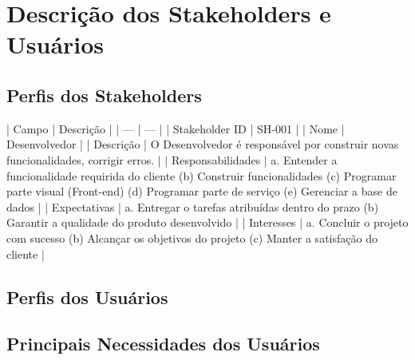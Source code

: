 \chapter{Descrição dos Stakeholders e Usuários}

\section{Perfis dos Stakeholders}

\begin{markdown}

| Campo | Descrição |
| --- | --- |
| Stakeholder ID | SH-001 |
| Nome | Desenvolvedor  |
| Descrição | O Desenvolvedor é responsável por construir novas funcionalidades, corrigir erros. |
| Responsabilidades | a. Entender a funcionalidade requirida do cliente (b) Construir funcionalidades (c) Programar parte visual (Front-end) (d) Programar parte de serviço (e) Gerenciar a base de dados |
| Expectativas | a. Entregar o tarefas atribuídas dentro do prazo (b) Garantir a qualidade do produto desenvolvido |
| Interesses | a. Concluir o projeto com sucesso (b) Alcançar os objetivos do projeto (c) Manter a satisfação do cliente |

\end{markdown}

\section{Perfis dos Usuários}
\section{Principais Necessidades dos Usuários}
